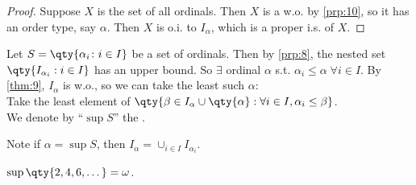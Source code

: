 \begin{proof}
    Suppose $X$ is the set of all ordinals.
    Then $X$ is a w.o. by \cref{prp:10}, so it has an order type, say $\alpha$.
    Then $X$ is o.i. to $I_\alpha$, which is a proper i.s. of $X$. \Lightning
\end{proof}

\begin{remark}
    Let $S = \qty{\alpha_i \colon i \in I}$ be a set of ordinals.
    Then by \cref{prp:8}, the nested set $\qty{I_{\alpha_i} : i \in I}$ has an upper bound.
    So $\exists$ ordinal $\alpha$ s.t. $\alpha_i \leq \alpha \; \forall i \in I$.
    By \cref{thm:9}, $I_\alpha$ is w.o., so we can take the least such $\alpha$: \\
    Take the least element of $\qty{\beta \in I_\alpha \cup \qty{\alpha} : \forall i \in I, \alpha_i \leq \beta}$. \\
    We denote by ``$\sup S$'' the .

    Note if $\alpha = \sup S$, then $I_\alpha = \cup_{i \in I} I_{\alpha_i}$.
\end{remark}

\begin{example}
    $\sup \qty{2, 4, 6, \dots} = \omega$.
\end{example}

